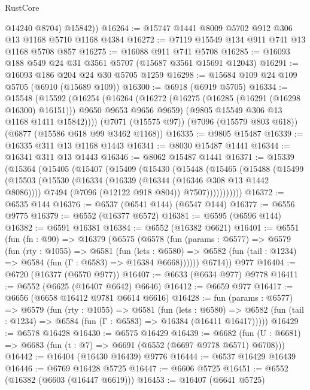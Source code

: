\begin{lexlean}{RustCore}
\begin{coremodule}
          @14240
          @8704)
        @15842))
@16264 := @15747 @1441 @8009 @5702 @912 @306 @13 @1168 @5710 @1168 @4384
@16272 := @7119 @15549 @134 @911 @741 @13 @1168 @5708 @857
@16275 := @16088 @911 @741 @5708
@16285 := @16093 @188 @549 @24 @31 @3561 @5707 (@15687 @3561 @15691 @12043)
@16291 := @16093 @186 @204 @24 @30 @5705 @1259
@16298 := @15684 @109 @24 @109 @5705 (@6910 (@15689 @109))
@16300 := @6918 (@6919 @5705)
@16334 := @15548
    (@15592
      (@16254
        (@16264
          (@16272 (@16275 (@16285 (@16291 (@16298 @16300) @16151))) @9650 @9653 @9656 @9659)
          (@9805 @15549 @306 @13 @1168 @1411 @15842))))
    (@7071 (@15575 @97))
    (@7096 (@15579 @803 @618))
    (@6877 (@15586 @618 @99 @3462 @1168))
@16335 := @9805 @15487
@16339 := @16335 @311 @13 @1168 @1443
@16341 := @8030 @15487 @1441
@16344 := @16341 @311 @13 @1443
@16346 := @8062 @15487 @1441
@16371 := @15339
    (@15364
      (@15405
        (@15407
          (@15409
            (@15430
              (@15448
                (@15465
                  (@15488
                    (@15499
                      (@15503
                        (@15530
                          (@16334 (@16339 (@16344 (@16346 @308 @13 @1442 @8086))))
                          @7494
                          (@7096 (@12122 @918 @804))
                          @7507)))))))))))
@16372 := @6535 @144
@16376 := @6537 (@6541 @144) (@6547 @144)
@16377 := @6556 @9775
@16379 := @6552 (@16377 @6572)
@16381 := @6595 (@6596 @144)
@16382 := @6591 @16381
@16384 := @6552 (@16382 @6621)
@16401 := @6551
    (fun (fn : @90) =>
    @16379
      (@6575
        (@6578
          (fun (params : @6577) =>
          @6579
            (fun (rty : @1055) =>
            @6581
              (fun (lets : @6580) =>
              @6582 (fun (tail : @1234) => @6584 (fun (Γ : @6583) => @16384 @6668))))))
        @6714))
    @977
@16404 := @6720 (@16377 (@6570 @977))
@16407 := @6633 (@6634 @977) @9778
@16411 := @6552 (@6625 (@16407 @6642) @6646)
@16412 := @6659 @977
@16417 := @6656 (@6658 @16412 @9781 @6614 @6616)
@16428 := fun (params : @6577) =>
  @6579
    (fun (rty : @1055) =>
    @6581
      (fun (lets : @6580) =>
      @6582 (fun (tail : @1234) => @6584 (fun (Γ : @6583) => @16384 (@16411 @16417)))))
@16429 := @6578 @16428
@16430 := @6575 @16429
@16439 := @6682 (fun (U : @6681) => @6683 (fun (t : @7) => @6691 (@6552 (@6697 @9778 @6571) @6708)))
@16442 := @16404 (@16430 @16439) @9776
@16444 := @6537 @16429 @16439
@16446 := @6769 @16428 @5725
@16447 := @6606 @5725
@16451 := @6552 (@16382 (@6603 (@16447 @6619)))
@16453 := @16407 (@6641 @5725)

\end{coremodule}
\end{lexlean}
